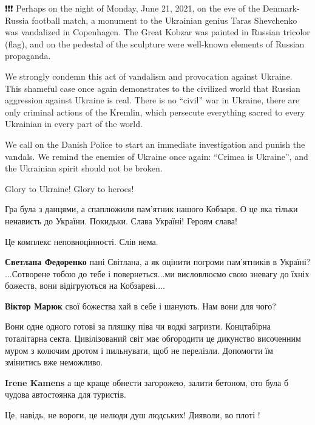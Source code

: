 \begin{itemize}
❗️❗️❗️ Perhaps on the night of Monday, June 21, 2021, on the eve of the
Denmark-Russia football match, a monument to the Ukrainian genius Taras
Shevchenko was vandalized in Copenhagen. The Great Kobzar was painted in
Russian tricolor (flag), and on the pedestal of the sculpture were well-known
elements of Russian propaganda.

We strongly condemn this act of vandalism and provocation against Ukraine. This
shameful case once again demonstrates to the civilized world that Russian
aggression against Ukraine is real. There is no \enquote{civil} war in Ukraine, there
are only criminal actions of the Kremlin, which persecute everything sacred to
every Ukrainian in every part of the world.

We call on the Danish Police to start an immediate investigation and punish the
vandals. We remind the enemies of Ukraine once again: \enquote{Crimea is Ukraine}, and
the Ukrainian spirit should not be broken.

Glory to Ukraine!
Glory to heroes!


Гра була з данцями, а спаплюжили пам'ятник нашого Кобзаря. О це яка тільки
ненависть до України. Покидьки. Слава Україні! Героям слава!

Це комплекс неповноцінності. Слів нема.

\textbf{Светлана Федоренко} пані Світлана, а як оцінити погроми пам'ятників в
Україні?  ...Сотворене тобою до тебе і повернеться...ми висловлюємо свою
зневагу до їхніх божеств, вони відігруються на Кобзареві....

\textbf{Віктор Марюк} свої божества хай в себе і шанують. Нам вони для чого?


Вони одне одного готові за пляшку піва чи водкі загризти. Концтабірна
тоталітарна секта. Цивілізований світ має обгородити це дикунство височенним
муром з колючим дротом і пильнувати, щоб не перелізли. Допомогти їм змінитись
вже неможливо.

\textbf{Irene Kamens} а ще краще обнести загорожею, залити бетоном, ото була б
чудова автостоянка для туристів.


Це, навідь, не вороги, це нелюди душ людських!
Дияволи, во плоті !



\end{itemize}
